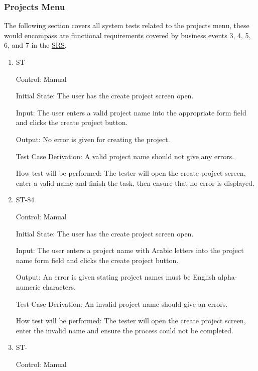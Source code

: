 \documentclass[12pt, titlepage]{article}
\newcounter{TESTID}
\newcommand\TESTNUM{\stepcounter{TESTID}\theTESTID}
\begin{document}
	\subsubsection{Projects Menu}
	
	The following section covers all system tests related to the projects menu, these would encompass are functional requirements covered by business events 3, 4, 5, 6, and 7 in the \href{https://github.com/RutheniumVI/UnderTree/blob/main/docs/SRS/SRS.pdf}{SRS}.
	
	\begin{enumerate}
		
		\item{ST-\TESTNUM\\}
		
		Control: Manual
		
		Initial State: The user has the create project screen open.
		
		Input: The user enters a valid project name into the appropriate form field and clicks the create project button.
		
		Output: No error is given for creating the project. 
		
		Test Case Derivation: A valid project name should not give any errors.
		
		How test will be performed: The tester will open the create project screen, enter a valid name and finish the task, then ensure that no error is displayed.
		
		\item{ST-84\\}
		
		Control: Manual
		
		Initial State: The user has the create project screen open.
		
		Input: The user enters a project name with Arabic letters into the project name form field and clicks the create project button.
		
		Output: An error is given stating project names must be English alpha-numeric characters. 
		
		Test Case Derivation: An invalid project name should give an errors.
		
		How test will be performed: The tester will open the create project screen, enter the invalid name and ensure the process could not be completed.
		
		\item{ST-\TESTNUM\\}
		
		Control: Manual
		

\end{enumerate}
\end{document}
